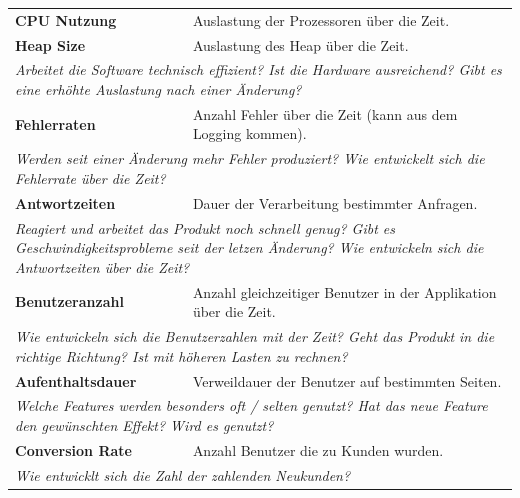 \begin{table}[H]
  \centering
  \begin{tabular}{p{5cm}p{9.5cm}} \toprule
  \textbf{CPU Nutzung} & Auslastung der Prozessoren über die Zeit. \\
  \textbf{Heap Size} & Auslastung des Heap über die Zeit. \\
  \multicolumn{2}{p{14.5cm}}{\textit{Arbeitet die Software technisch effizient? \newline Ist die Hardware ausreichend? \newline Gibt es eine erhöhte Auslastung nach einer Änderung?}} \\ \midrule
  \textbf{Fehlerraten} & Anzahl Fehler über die Zeit (kann aus dem Logging kommen). \\
  \multicolumn{2}{p{14.5cm}}{\textit{Werden seit einer Änderung mehr Fehler produziert? \newline Wie entwickelt sich die Fehlerrate über die Zeit?}} \\ \midrule
  \textbf{Antwortzeiten} & Dauer der Verarbeitung bestimmter Anfragen. \\
  \multicolumn{2}{p{14.5cm}}{\textit{Reagiert und arbeitet das Produkt noch schnell genug? \newline Gibt es Geschwindigkeitsprobleme seit der letzen Änderung? \newline Wie entwickeln sich die Antwortzeiten über die Zeit?}} \\ \midrule
  \textbf{Benutzeranzahl} & Anzahl gleichzeitiger Benutzer in der Applikation über die Zeit. \\
  \multicolumn{2}{p{14.5cm}}{\textit{Wie entwickeln sich die Benutzerzahlen mit der Zeit? \newline Geht das Produkt in die richtige Richtung? \newline Ist mit höheren Lasten zu rechnen?}} \\ \midrule
  \textbf{Aufenthaltsdauer} & Verweildauer der Benutzer auf bestimmten Seiten. \\
  \multicolumn{2}{p{14.5cm}}{\textit{Welche Features werden besonders oft / selten genutzt? \newline Hat das neue Feature den gewünschten Effekt? Wird es genutzt?}} \\ \midrule
  \textbf{Conversion Rate} & Anzahl Benutzer die zu Kunden wurden. \\
  \multicolumn{2}{p{14.5cm}}{\textit{Wie entwicklt sich die Zahl der zahlenden Neukunden?}} \\ \midrule

\end{tabular}
\end{table}
